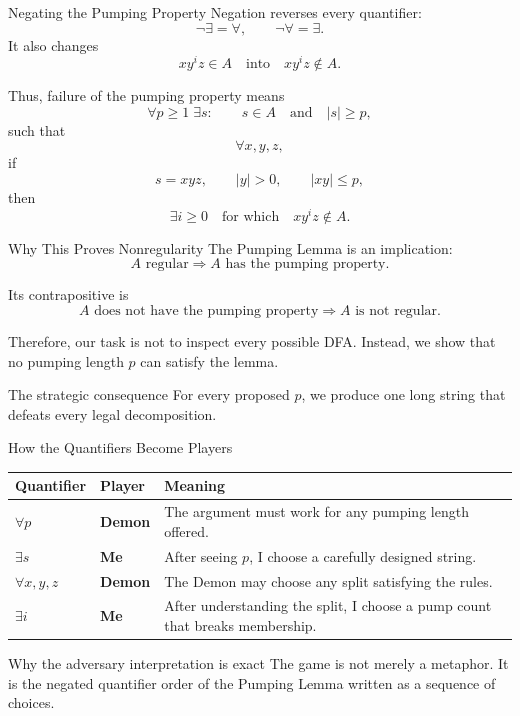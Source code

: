 \documentclass[10pt,aspectratio=169]{beamer}
\newcommand{\Demon}{\textbf{\alert{Demon}}}
\newcommand{\Me}{\textbf{\color{blue!70!black}Me}}
\begin{document}
\begin{frame}{Negating the Pumping Property}
\small
Negation reverses every quantifier:
\[
\neg\exists=\forall,
\qquad
\neg\forall=\exists.
\]
It also changes
\[
xy^iz\in A
\quad\text{into}\quad
xy^iz\notin A.
\]

Thus, failure of the pumping property means
\[
\forall p\geq 1\;\exists s:
\qquad s\in A\quad\text{and}\quad |s|\geq p,
\]
such that
\[
\forall x,y,z,
\]
if
\[
s=xyz,
\qquad |y|>0,
\qquad |xy|\leq p,
\]
then
\[
\exists i\geq 0
\quad\text{for which}\quad
xy^iz\notin A.
\]
\end{frame}

\begin{frame}{Why This Proves Nonregularity}
The Pumping Lemma is an implication:
\[
A\text{ regular}
\Longrightarrow
A\text{ has the pumping property}.
\]

Its contrapositive is
\[
A\text{ does not have the pumping property}
\Longrightarrow
A\text{ is not regular}.
\]

Therefore, our task is not to inspect every possible DFA. Instead, we
show that no pumping length $p$ can satisfy the lemma.

\begin{block}{The strategic consequence}
For every proposed $p$, we produce one long string that defeats every
legal decomposition.
\end{block}
\end{frame}

\begin{frame}{How the Quantifiers Become Players}
\small
\renewcommand{\arraystretch}{1.35}
\begin{center}
\begin{tabular}{p{2.1cm}p{3.1cm}p{7.1cm}}
\toprule
\textbf{Quantifier} & \textbf{Player} & \textbf{Meaning} \\
\midrule
$\forall p$ & \Demon & The argument must work for any pumping length offered. \\
$\exists s$ & \Me & After seeing $p$, I choose a carefully designed string. \\
$\forall x,y,z$ & \Demon & The Demon may choose any split satisfying the rules. \\
$\exists i$ & \Me & After understanding the split, I choose a pump count that breaks membership. \\
\bottomrule
\end{tabular}
\end{center}

\begin{alertblock}{Why the adversary interpretation is exact}
The game is not merely a metaphor. It is the negated quantifier order of
the Pumping Lemma written as a sequence of choices.
\end{alertblock}
\end{frame}
\end{document}
